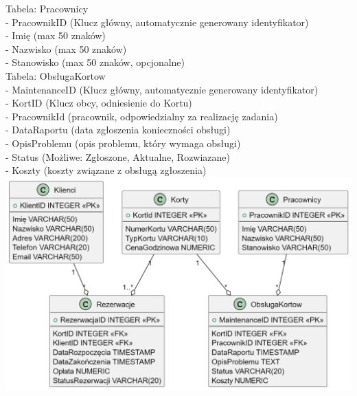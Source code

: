 \documentclass{article}
\begin{document}
Tabela: Pracownicy\\
- PracownikID (Klucz główny, automatycznie generowany identyfikator)\\
- Imię (max 50 znaków)\\
- Nazwisko (max 50 znaków)\\
- Stanowisko (max 50 znaków, opcjonalne)\\

Tabela: ObsługaKortow\\
- MaintenanceID (Klucz główny, automatycznie generowany identyfikator)\\
- KortID (Klucz obcy, odniesienie do Kortu)\\
- PracownikId (pracownik, odpowiedzialny za realizację zadania)\\
- DataRaportu (data zgłoszenia konieczności obsługi)\\
- OpisProblemu (opis problemu, który wymaga obsługi)\\
- Status (Możliwe: Zgłoszone, Aktualne, Rozwiazane)\\
- Koszty (koszty związane z obsługą zgłoszenia)\\

\includegraphics{diagram.png}
\end{document}
